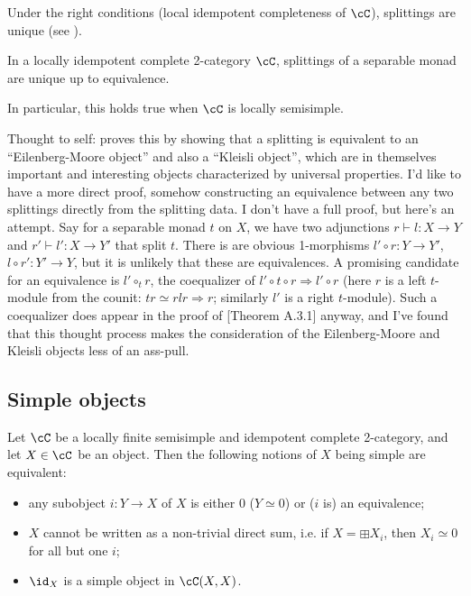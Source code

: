 \documentclass[12pt]{article}
\begin{document}
Under the right conditions
(local idempotent completeness of $\cC$), splittings are unique
(see ).




\begin{proposition}
\label{p:splitting-unique}
In a locally idempotent complete 2-category $\cC$,
splittings of a separable monad are unique
up to equivalence.
\end{proposition}

In particular, this holds true when $\cC$
is locally semisimple.

Thought to self:
\cite{DRfusion} proves this by showing that
a splitting is equivalent
to an ``Eilenberg-Moore object'' and also a ``Kleisli object'',
which are in themselves important and interesting objects
characterized by universal properties.
I'd like to have a more direct proof,
somehow constructing an equivalence between any two splittings
directly from the splitting data.
I don't have a full proof, but here's an attempt.
Say for a separable monad $t$ on $X$,
we have two adjunctions $r \vdash l : X \to Y$
and $r' \vdash l' : X \to Y'$
that split $t$.
There is are obvious 1-morphisms $l' \circ r: Y \to Y'$,
$l \circ r': Y' \to Y$,
but it is unlikely that these are equivalences.
A promising candidate for an equivalence
is $l' \circ_t r$, the coequalizer of
$l' \circ t \circ r \Rightarrow l' \circ r$
(here $r$ is a left $t$-module from the counit:
$tr \simeq rlr \Rightarrow r$;
similarly $l'$ is a right $t$-module).
Such a coequalizer does appear in the proof of
\cite{DRfusion}[Theorem A.3.1] anyway,
and I've found that this thought process
makes the consideration of the Eilenberg-Moore and Kleisli
objects less of an ass-pull.


\subsection{Simple objects}


\begin{proposition}
Let $\cC$ be a locally finite semisimple and
idempotent complete 2-category,
and let $X \in \cC$ be an object.
Then the following notions of $X$ being simple are equivalent:
\begin{itemize}
\item any subobject $i: Y \to X$ of $X$
 is either 0 ($Y \simeq 0$)
 or ($i$ is) an equivalence;

\item $X$ cannot be written as a non-trivial direct sum,
	i.e. if $X = \boxplus X_i$,
	then $X_i \simeq 0$ for all but one $i$;

\item $\id_X$ is a simple object in $\cC(X,X)$.
\end{itemize}
\end{proposition}
\end{document}
